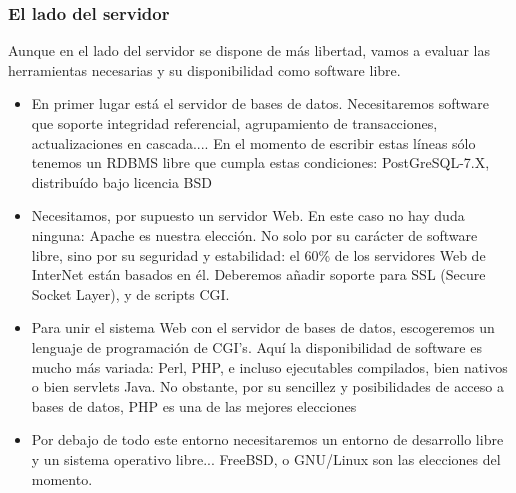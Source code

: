 \subsubsection*{El lado del servidor}
Aunque en el lado del servidor se dispone de más libertad, vamos a evaluar las herramientas necesarias y su disponibilidad como software libre.


\begin{itemize}
\item En primer lugar está el servidor de bases de datos. Necesitaremos software que soporte integridad referencial, agrupamiento de transacciones, actualizaciones en cascada.... En el momento de escribir estas líneas sólo tenemos un RDBMS libre que cumpla estas condiciones: PostGreSQL-7.X, distribuído bajo licencia BSD
\item Necesitamos, por supuesto un servidor Web. En este caso no hay duda ninguna: Apache es nuestra elección. No solo por su carácter de software libre, sino por su seguridad y estabilidad: el 60\% de los servidores Web de InterNet están basados en él. Deberemos añadir soporte para SSL (Secure Socket Layer), y de scripts CGI.
\item Para unir el sistema Web con el servidor de bases de datos, escogeremos un lenguaje de programación de CGI's. Aquí la disponibilidad de software es mucho más variada: Perl, PHP, e incluso ejecutables compilados, bien nativos o bien servlets Java. No obstante, por su sencillez y posibilidades de acceso a bases de datos,  PHP es una de las mejores elecciones
\item Por debajo de todo este entorno necesitaremos un entorno de desarrollo libre y un sistema operativo libre... FreeBSD, o GNU/Linux son las elecciones del momento.
\end{itemize}

